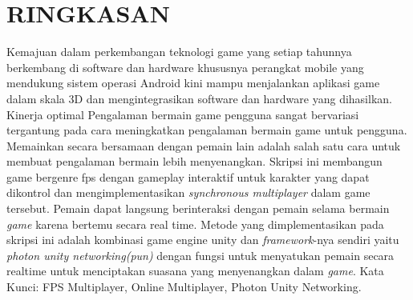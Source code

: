 \chapter*{RINGKASAN}
\noindent


Kemajuan dalam perkembangan teknologi game yang setiap tahunnya berkembang di 
software dan hardware khususnya  perangkat mobile yang mendukung sistem operasi Android 
kini mampu menjalankan aplikasi game dalam skala 3D dan mengintegrasikan software dan hardware yang dihasilkan. 
Kinerja optimal Pengalaman bermain game pengguna sangat bervariasi tergantung pada cara  meningkatkan pengalaman bermain game untuk pengguna. 
Memainkan secara bersamaan dengan pemain lain adalah salah satu cara untuk membuat pengalaman bermain lebih menyenangkan. 
Skripsi ini membangun game bergenre fps dengan gameplay  interaktif untuk 
karakter yang dapat dikontrol dan mengimplementasikan \textit{synchronous multiplayer} dalam game tersebut. 
Pemain dapat langsung berinteraksi dengan 
pemain selama bermain \textit{game} karena bertemu secara real time. 
Metode yang dimplementasikan pada skripsi ini adalah kombinasi game engine unity dan \textit{framework}-nya sendiri yaitu \textit{photon unity networking(pun)}
dengan fungsi untuk menyatukan pemain secara realtime untuk menciptakan suasana yang menyenangkan dalam \textit{game}.
\newline \break
\noindent Kata Kunci: FPS Multiplayer, Online Multiplayer, Photon Unity Networking.